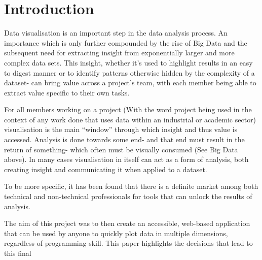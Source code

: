 \section{Introduction}


Data visualisation is an important step in the data analysis process. An importance which is only further compounded by the rise of Big Data and the subsequent need for extracting insight from exponentially larger and more complex data sets. This insight, whether it’s used to highlight results in an easy to digest manner or to identify patterns otherwise hidden by the complexity of a dataset- can bring value across a project’s team, with each member being able to extract value specific to their own tasks.

For all members working on a project (With the word project being used in the context of any work done that uses data within an industrial or academic sector) visualisation is the main “window” through which insight and thus value is accessed. Analysis is done towards some end- and that end must result in the return of something- which often must be visually consumed (See Big Data above). In many cases visualisation in itself can act as a form of analysis, both creating insight and communicating it when applied to a dataset.

To be more specific, it has been found that there is a definite market among both technical and non-technical professionals for tools that can unlock the results of analysis.

The aim of this project was to then create an accessible, web-based application that can be used by anyone to quickly plot data in multiple dimensions, regardless of programming skill. This paper highlights the decisions that lead to this final
